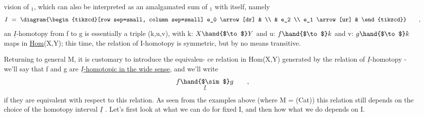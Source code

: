 vision of \hand{$\Delta$}$_1$, which can also be interpreted as an amalgamated
sum of \hand{$\Delta$}$_1$ with itself, namely
\[ I \ = \ \diagram{\begin{tikzcd}[row sep=small, column sep=small] e_0 \arrow[dr] & \\ & e_2 \\ e_1 \arrow[ur] & \end{tikzcd}} \qquad , \]
an $\underline{I}$-homotopy from f to g is essentially a triple (k,u,v), with
k: $X \hand{$\to$} Y$ and u: $f \hand{$\to$} k$ and v: $g \hand{$\to$} k$ maps in \uline{Hom}(X,Y); this time, the
relation of I-homotopy is symmetric, but by no means transitive.

Returning to general M, it is customary to introduce the equivalen-%
ce relation in Hom(X,Y) generated by the relation of $\underline{I}$-homotopy - we'll
say that f and g are \uline{$\underline{I}$-homotopic in the wide sense}, and we'll write
\[ f \underset{\underline{I}}{\hand{$\sim$}} g \qquad , \]
if they are equivalent with respect to this relation. As seen from the 
 examples above (where M = (Cat))\hand{,} this relation still depends on
the choice of the homotopy interval $\underline{I}$ . Let's first look at what we can
do for fixed I, and then how what we do depends on I.

